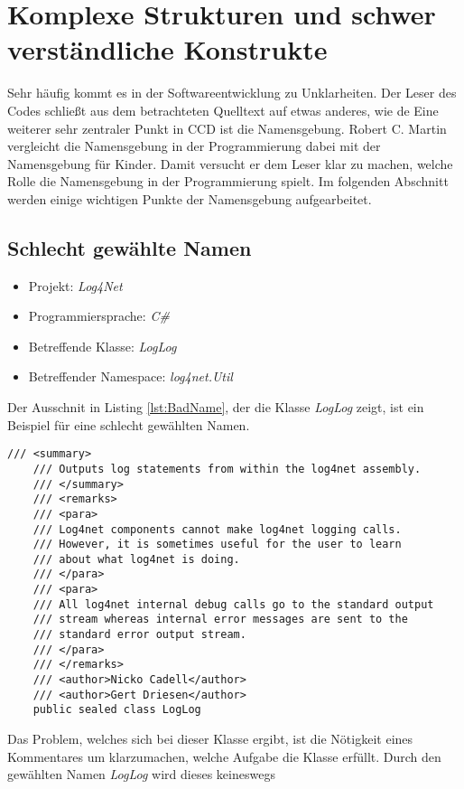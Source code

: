 \section{Komplexe Strukturen und schwer verständliche Konstrukte}

\SuperPar  Sehr häufig kommt es in der Softwareentwicklung zu Unklarheiten. Der Leser des Codes schließt aus dem betrachteten Quelltext auf etwas anderes, wie de
Eine weiterer sehr zentraler Punkt in CCD ist die Namensgebung. Robert C. Martin vergleicht die Namensgebung in der Programmierung dabei mit
der Namensgebung für Kinder. Damit versucht er dem Leser klar zu machen, welche Rolle die Namensgebung in der Programmierung spielt. Im
folgenden Abschnitt werden einige wichtigen Punkte der Namensgebung aufgearbeitet.

\subsection{Schlecht gewählte Namen}
\begin{itemize}
	\item Projekt: \textit{Log4Net}
	\item Programmiersprache: \textit{C\#}
	\item Betreffende Klasse: \textit{LogLog}
	\item Betreffender Namespace: \textit{log4net.Util}
\end{itemize}

\SuperPar Der Ausschnit in Listing \ref{lst:BadName}, der die Klasse \textit{LogLog} zeigt, ist ein Beispiel für eine schlecht gewählten Namen.

\begin{lstlisting}[language={[Sharp]C}, caption=Beispiele für schlechte Namensgebung, label=lst:BadName]
/// <summary>
	/// Outputs log statements from within the log4net assembly.
	/// </summary>
	/// <remarks>
	/// <para>
	/// Log4net components cannot make log4net logging calls.
	/// However, it is sometimes useful for the user to learn 
	/// about what log4net is doing.
	/// </para>
	/// <para>
	/// All log4net internal debug calls go to the standard output 
	/// stream whereas internal error messages are sent to the 
	/// standard error output stream.
	/// </para>
	/// </remarks>
	/// <author>Nicko Cadell</author>
	/// <author>Gert Driesen</author>
	public sealed class LogLog
\end{lstlisting}

\SuperPar Das Problem, welches sich bei dieser Klasse ergibt, ist die Nötigkeit eines Kommentares um klarzumachen, welche  Aufgabe die Klasse erfüllt. Durch den gewählten Namen \textit{LogLog} wird dieses keineswegs

